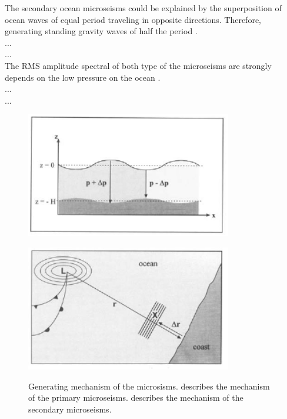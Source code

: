 The secondary ocean microseisms could be explained by the superposition of ocean waves of equal period traveling in opposite directions. Therefore, generating standing gravity waves of half the period \cite{longuet1950theory}. 
\\
...\\
...\\

The RMS amplitude spectral of both type of the microseisms are strongly depends on the low pressure on the ocean \cite{naticchioni2014microseismic}.
\\
...\\
...\\

\begin{figure}[h]
  \begin{center}
    \begin{minipage}[b]{0.65\hsize}
      \centering
      \includegraphics[width=9.0cm]{./img_chap3/img311.png}
      \label{img:img311}
    \end{minipage}
    \begin{minipage}[b]{0.65\hsize}
      \centering      
      \includegraphics[width=9.0cm]{./img_chap3/img312.png}
      \label{img:img312}
    \end{minipage}
  \end{center}
  \caption{ Generating mechanism of the microsisms.  describes the mechanism of the primary microseisms.  describes the mechanism of the secondary microseisms.}
\end{figure}


